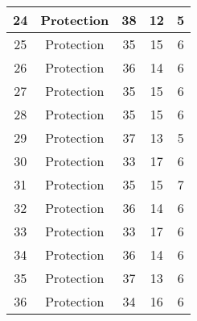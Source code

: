 \documentclass[results.tex]{subfiles}
\begin{document}
\begin{center}
\begin{tabular}{| c || c | c | c | c |}
            \hline
            24                      & Protection                   & 38                     & 12                      & 5                    \\
            \hline
            25                      & Protection                   & 35                     & 15                      & 6                    \\
            \hline
            26                      & Protection                   & 36                     & 14                      & 6                    \\
            \hline
            27                      & Protection                   & 35                     & 15                      & 6                    \\
            \hline
            28                      & Protection                   & 35                     & 15                      & 6                    \\
            \hline
            29                      & Protection                   & 37                     & 13                      & 5                    \\
            \hline
            30                      & Protection                   & 33                     & 17                      & 6                    \\
            \hline
            31                      & Protection                   & 35                     & 15                      & 7                    \\
            \hline
            32                      & Protection                   & 36                     & 14                      & 6                    \\
            \hline
            33                      & Protection                   & 33                     & 17                      & 6                    \\
            \hline
            34                      & Protection                   & 36                     & 14                      & 6                    \\
            \hline
            35                      & Protection                   & 37                     & 13                      & 6                    \\
            \hline
            36                      & Protection                   & 34                     & 16                      & 6                    \\

\end{tabular}
\end{center}
\end{document}
